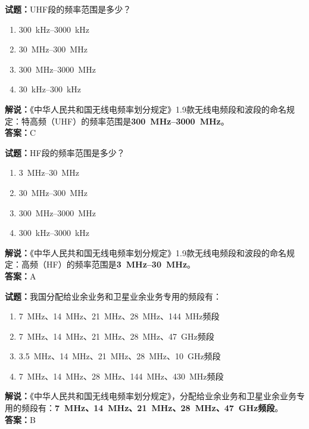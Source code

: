 \documentclass{ctexbook}
\begin{document}
\bigskip

\noindent\textbf{试题：}UHF段的频率范围是多少？
\begin{enumerate}[leftmargin=3em]
  \item \qtyrange[range-phrase=\mbox{到}]{300}{3000}{\kHz}
  \item \qtyrange[range-phrase=\mbox{到}]{30}{300}{\MHz}
  \item \qtyrange[range-phrase=\mbox{到}]{300}{3000}{\MHz}
  \item \qtyrange[range-phrase=\mbox{到}]{30}{300}{\kHz}
\end{enumerate}
\noindent\textbf{解说：}《中华人民共和国无线电频率划分规定》1.9款无线电频段和波段的命名规定：特高频（UHF）的频率范围是\textbf{\qtyrange[range-phrase=\mbox{到}]{300}{3000}{\MHz}}。\\\noindent\textbf{答案：}C

\bigskip

\noindent\textbf{试题：}HF段的频率范围是多少？
\begin{enumerate}[leftmargin=3em]
  \item \qtyrange[range-phrase=\mbox{到}]{3}{30}{\MHz}
  \item \qtyrange[range-phrase=\mbox{到}]{30}{300}{\MHz}
  \item \qtyrange[range-phrase=\mbox{到}]{300}{3000}{\MHz}%
  \item \qtyrange[range-phrase=\mbox{到}]{300}{3000}{\kHz}%
\end{enumerate}
\noindent\textbf{解说：}《中华人民共和国无线电频率划分规定》1.9款无线电频段和波段的命名规定：高频（HF）的频率范围是\textbf{\qtyrange[range-phrase=\mbox{到}]{3}{30}{\MHz}}。\\\noindent\textbf{答案：}A

\bigskip

\noindent\textbf{试题：}我国分配给业余业务和卫星业余业务专用的频段有：
\begin{enumerate}[leftmargin=3em]
  \item \qty{7}{\MHz}、\qty{14}{\MHz}、\qty{21}{\MHz}、\qty{28}{\MHz}、\qty{144}{\MHz}频段
  \item \qty{7}{\MHz}、\qty{14}{\MHz}、\qty{21}{\MHz}、\qty{28}{\MHz}、\qty{47}{\GHz}频段
  \item \qty{3.5}{\MHz}、\qty{14}{\MHz}、\qty{21}{\MHz}、\qty{28}{\MHz}、\qty{10}{\GHz}频段
  \item \qty{7}{\MHz}、\qty{14}{\MHz}、\qty{28}{\MHz}、\qty{144}{\MHz}、\qty{430}{\MHz}频段
\end{enumerate}
\noindent\textbf{解说：}《中华人民共和国无线电频率划分规定》，分配给业余业务和卫星业余业务专用的频段有：\textbf{\qty{7}{\MHz}、\qty{14}{\MHz}、\qty{21}{\MHz}、\qty{28}{\MHz}、\qty{47}{\GHz}频段}。\\\noindent\textbf{答案：}B
\end{document}
